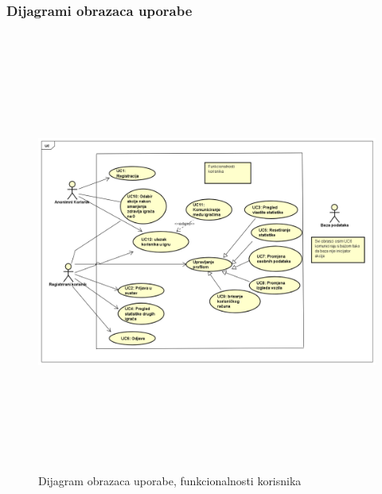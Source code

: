 			    \newpage
				\subsubsection{Dijagrami obrazaca uporabe}
				
				\begin{figure}[h]
					\centering
					\includegraphics[width=18.5cm,height=14.5cm]{useCaseDiagram1}
					\caption{Dijagram obrazaca uporabe, funkcionalnosti korisnika}
					\label{fig:uc1}
				\end{figure}
			
